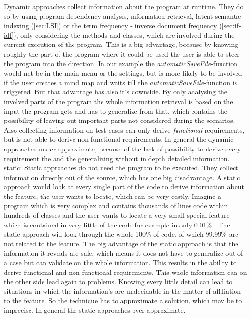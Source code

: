 Dynamic approaches collect information about the program at runtime. They do so by using program dependency analysis, information retrieval, latent semantic indexing (\autoref{sec:LSI}) or the term frequency - inverse document frequency {(\autoref{sec:tf-idf}), only considering the methods and classes, which are involved during the current execution of the program. This is a big advantage, because by knowing roughly the part of the program where it could be used the user is able to steer the program into the direction. In our example the \emph{automaticSaveFile}-function would not be in the main-menu or the settings, but is more likely to be involved if the user creates a mind map and waits till the \emph{automaticSaveFile}-function is triggered. But that advantage has also it's downside. By only analysing the involved parts of the program the whole information retrieval is based on the input the program gets and has to generalize from that, which contains the possibility of leaving out important parts not considered during the scenarios. Also collecting information on test-cases can only derive \emph{functional} requirements, but is not able to derive non-functional requirements. In general the dynamic approaches under approximate, because of the lack of possibility to derive every requirement the and the generalizing without in depth detailed information.\newline
\underline{static}:\newline
Static approaches do not need the program to be executed. They collect information directly out of the source, which has  one big disadvantage. A static approach would look at every single part of the code to derive information about the feature, the user wants to locate, which can be very costly. Imagine a program which is very complex and contains thousands of lines code within hundreds of classes and the user wants to locate a very small special feature which is contained in very little of the code for example in only 0.01\% . The static approach will look through the whole 100\% of code, of which 99.99\% are not related to the feature. The big advantage of the static approach is that the information it reveals are safe, which means it does not have to generalize out of a case but can validate on the whole information. This results in the ability to derive functional and non-functional requirements. This whole information can on the other side lead again to problems. Knowing every little detail can lead to situations in which the information's are undecidable in the matter of affiliation to the feature. So the technique has to approximate a solution, which may be to imprecise. In general the static approaches over approximate. \newline
}
